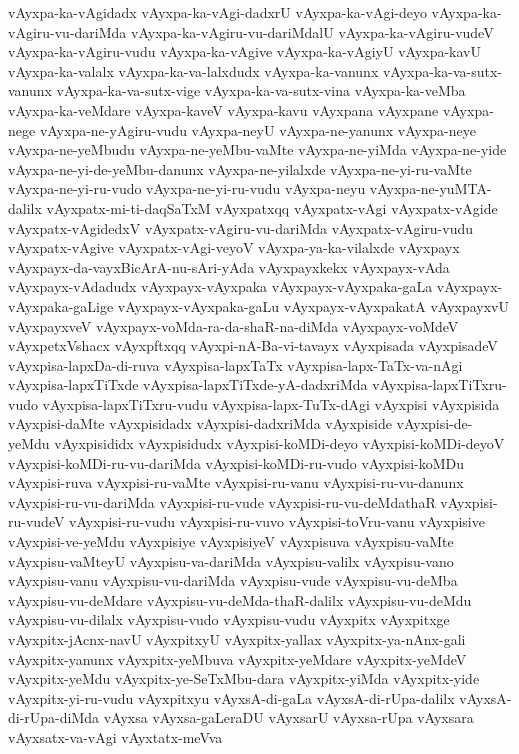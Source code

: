 {vAyxpa-ka-vAgidadx
vAyxpa-ka-vAgi-dadxrU
vAyxpa-ka-vAgi-deyo
vAyxpa-ka-vAgiru-vu-dariMda
vAyxpa-ka-vAgiru-vu-dariMdalU
vAyxpa-ka-vAgiru-vudeV
vAyxpa-ka-vAgiru-vudu
vAyxpa-ka-vAgive
vAyxpa-ka-vAgiyU
vAyxpa-kavU
vAyxpa-ka-valalx
vAyxpa-ka-va-lalxdudx
vAyxpa-ka-vanunx
vAyxpa-ka-va-sutx-vanunx
vAyxpa-ka-va-sutx-vige
vAyxpa-ka-va-sutx-vina
vAyxpa-ka-veMba
vAyxpa-ka-veMdare
vAyxpa-kaveV
vAyxpa-kavu
vAyxpana
vAyxpane
vAyxpa-nege
vAyxpa-ne-yAgiru-vudu
vAyxpa-neyU
vAyxpa-ne-yanunx
vAyxpa-neye
vAyxpa-ne-yeMbudu
vAyxpa-ne-yeMbu-vaMte
vAyxpa-ne-yiMda
vAyxpa-ne-yide
vAyxpa-ne-yi-de-yeMbu-danunx
vAyxpa-ne-yilalxde
vAyxpa-ne-yi-ru-vaMte
vAyxpa-ne-yi-ru-vudo
vAyxpa-ne-yi-ru-vudu
vAyxpa-neyu
vAyxpa-ne-yuMTA-dalilx
vAyxpatx-mi-ti-daqSaTxM
vAyxpatxqq
vAyxpatx-vAgi
vAyxpatx-vAgide
vAyxpatx-vAgidedxV
vAyxpatx-vAgiru-vu-dariMda
vAyxpatx-vAgiru-vudu
vAyxpatx-vAgive
vAyxpatx-vAgi-veyoV
vAyxpa-ya-ka-vilalxde
vAyxpayx
vAyxpayx-da-vayxBicArA-nu-sAri-yAda
vAyxpayxkekx
vAyxpayx-vAda
vAyxpayx-vAdadudx
vAyxpayx-vAyxpaka
vAyxpayx-vAyxpaka-gaLa
vAyxpayx-vAyxpaka-gaLige
vAyxpayx-vAyxpaka-gaLu
vAyxpayx-vAyxpakatA
vAyxpayxvU
vAyxpayxveV
vAyxpayx-voMda-ra-da-shaR-na-diMda
vAyxpayx-voMdeV
vAyxpetxVshacx
vAyxpftxqq
vAyxpi-nA-Ba-vi-tavayx
vAyxpisada
vAyxpisadeV
vAyxpisa-lapxDa-di-ruva
vAyxpisa-lapxTaTx
vAyxpisa-lapx-TaTx-va-nAgi
vAyxpisa-lapxTiTxde
vAyxpisa-lapxTiTxde-yA-dadxriMda
vAyxpisa-lapxTiTxru-vudo
vAyxpisa-lapxTiTxru-vudu
vAyxpisa-lapx-TuTx-dAgi
vAyxpisi
vAyxpisida
vAyxpisi-daMte
vAyxpisidadx
vAyxpisi-dadxriMda
vAyxpiside
vAyxpisi-de-yeMdu
vAyxpisididx
vAyxpisidudx
vAyxpisi-koMDi-deyo
vAyxpisi-koMDi-deyoV
vAyxpisi-koMDi-ru-vu-dariMda
vAyxpisi-koMDi-ru-vudo
vAyxpisi-koMDu
vAyxpisi-ruva
vAyxpisi-ru-vaMte
vAyxpisi-ru-vanu
vAyxpisi-ru-vu-danunx
vAyxpisi-ru-vu-dariMda
vAyxpisi-ru-vude
vAyxpisi-ru-vu-deMdathaR
vAyxpisi-ru-vudeV
vAyxpisi-ru-vudu
vAyxpisi-ru-vuvo
vAyxpisi-toVru-vanu
vAyxpisive
vAyxpisi-ve-yeMdu
vAyxpisiye
vAyxpisiyeV
vAyxpisuva
vAyxpisu-vaMte
vAyxpisu-vaMteyU
vAyxpisu-va-dariMda
vAyxpisu-valilx
vAyxpisu-vano
vAyxpisu-vanu
vAyxpisu-vu-dariMda
vAyxpisu-vude
vAyxpisu-vu-deMba
vAyxpisu-vu-deMdare
vAyxpisu-vu-deMda-thaR-dalilx
vAyxpisu-vu-deMdu
vAyxpisu-vu-dilalx
vAyxpisu-vudo
vAyxpisu-vudu
vAyxpitx
vAyxpitxge
vAyxpitx-jAcnx-navU
vAyxpitxyU
vAyxpitx-yallax
vAyxpitx-ya-nAnx-gali
vAyxpitx-yanunx
vAyxpitx-yeMbuva
vAyxpitx-yeMdare
vAyxpitx-yeMdeV
vAyxpitx-yeMdu
vAyxpitx-ye-SeTxMbu-dara
vAyxpitx-yiMda
vAyxpitx-yide
vAyxpitx-yi-ru-vudu
vAyxpitxyu
vAyxsA-di-gaLa
vAyxsA-di-rUpa-dalilx
vAyxsA-di-rUpa-diMda
vAyxsa
vAyxsa-gaLeraDU
vAyxsarU
vAyxsa-rUpa
vAyxsara
vAyxsatx-va-vAgi
vAyxtatx-meVva
}
